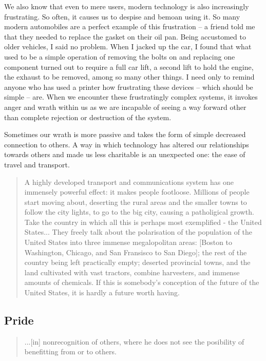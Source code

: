 \documentclass[letterpaper]{article}
\begin{document}
    We also know that even to mere users, modern technology is also increasingly frustrating. So often, it causes us to despise and bemoan using it. So many modern automobiles are a perfect example of this frustration -- a friend told me that they needed to replace the gasket on their oil pan. Being accustomed to older vehicles, I said no problem. When I jacked up the car, I found that what used to be a simple operation of removing the bolts on and replacing one component turned out to require a full car lift, a second lift to hold the engine, the exhaust to be removed, among so many other things. I need only to remind anyone who has used a printer how frustrating these devices -- which should be simple -- are. When we encounter these frustratingly complex systems, it invokes anger and wrath within us as we are incapable of seeing a way forward other than complete rejection or destruction of the system.

    Sometimes our wrath is more passive and takes the form of simple decreased connection to others. A way in which technology has altered our relationships towards others and made us less charitable is an unexpected one: the ease of travel and transport.

    \begin{quote}
      A highly developed transport and communications system has one immensely powerful effect: it makes people footloose. Millions of people start moving about, deserting the rural areas and the smaller towns to follow the city lights, to go to the big city, causing a patholigical growth. Take the country in which all this is perhaps most exemplified - the United States... They freely talk about the polarisation of the population of the United States into three immense megalopolitan areas: [Boston to Washington, Chicago, and San Fransisco to San Diego]; the rest of the country being left practically empty; deserted provincial towns, and the land cultivated with vast tractors, combine harvesters, and immense amounts of chemicals. If this is somebody's conception of the future of the United States, it is hardly a future worth having.
    \end{quote}

  \subsection{Pride}

    \begin{quote}
      ...[in] nonrecognition of others, where he does not see the posibility of benefitting from or to others.
    \end{quote}
\end{document}
